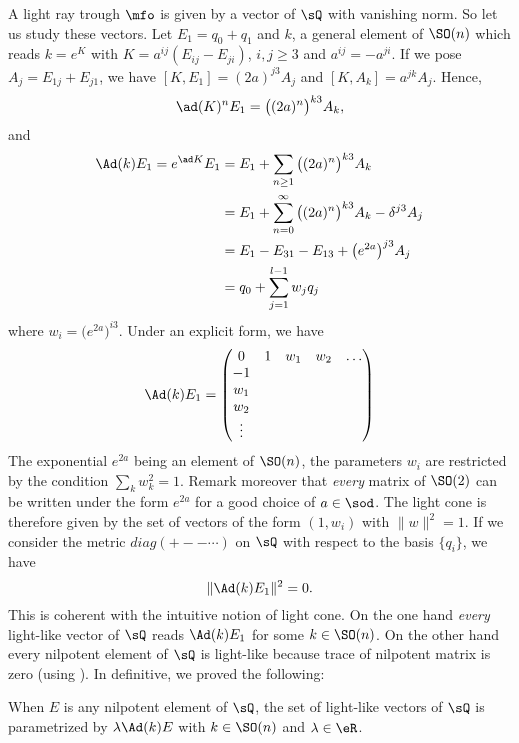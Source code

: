 A light ray trough $\mfo$ is given by a vector of $\sQ$ with vanishing norm. So let us study these vectors. Let $E_1=q_0+q_1$ and $k$, a general element of  $\SO(n)$ which reads $k= e^{K}$ with $K=a^{ij}(E_{ij}-E_{ji})$, $i,j\geq 3$ and $a^{ij}=-a^{ji}$.  If we pose $A_j=E_{1j}+E_{j1}$, we have $[K,E_1]=(2a)^{j3}A_j$ and $[K,A_k]=a^{jk}A_j$. Hence,
\[
	\ad(K)^nE_1=\big((2a)^n\big)^{k3}A_k,
\]
and
\begin{equation} \label{eq:Adkeu}
	\begin{split}
		\Ad(k)E_1=e^{\ad K}E_1&=E_1+\sum_{n\geq 1}\big( (2a)^n\big)^{k3}A_k\\
		&=E_1+\sum_{n=0}^{\infty}\big(  (2a)^n \big)^{k3}A_k-\delta^{j3}A_j\\
		&=E_1-E_{31}-E_{13}+\big( e^{2a}\big)^{j3}A_j\\
		&=q_0+\sum_{j=1}^{l-1}w_jq_j
	\end{split}
\end{equation}
where $w_i=\big(  e^{2a} \big)^{i3}$. Under an explicit form, we have
\begin{equation} \label{eq:AdkE}
	\Ad(k)E_1=
	\begin{pmatrix}
		0 & 1 & w_1 & w_2 & \ldots \\
		-1                         \\
		w_1                        \\
		w_2                        \\
		\vdots
	\end{pmatrix}
\end{equation}
The exponential $ e^{2a}$ being an element of $\SO(n)$, the parameters $w_i$ are restricted by the condition $\sum_{k}w_k^2=1$.  Remark moreover that \emph{every} matrix of $\SO(2)$ can be written under the form $e^{2a}$ for a good choice of $a\in\sod$. The light cone is therefore given by the set of vectors of the form $(1,w_i)$ with $\|w\|^2=1$. If we consider the metric $diag(+--\cdots)$ on $\sQ$ with respect to the basis $\{q_i\}$, we have
\[
	\|\Ad(k)E_1\|^2=0.
\]
This is coherent with the intuitive notion of light cone. On the one hand \emph{every} light-like vector of $\sQ$ reads $\Ad(k)E_1$ for some $k\in\SO(n)$. On the other hand every nilpotent element of $\sQ$ is light-like because trace of nilpotent matrix is zero (using ). In definitive, we proved the following:

\begin{proposition}		\label{PropNormZeroEQnil}
	When $E$ is any nilpotent element of $\sQ$, the set of light-like vectors of $\sQ$ is parametrized by $\lambda\Ad(k)E$ with $k\in\SO(n)$ and $\lambda\in\eR$.
	\label{PropToutVectLumQ}
\end{proposition}

